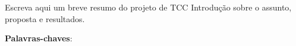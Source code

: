 \begin{resumo}

Escreva aqui um breve resumo do projeto de TCC {Introdução sobre o assunto, proposta e resultados}.

\vspace{\onelineskip}
\noindent
\textbf{Palavras-chaves}:
\end{resumo}
